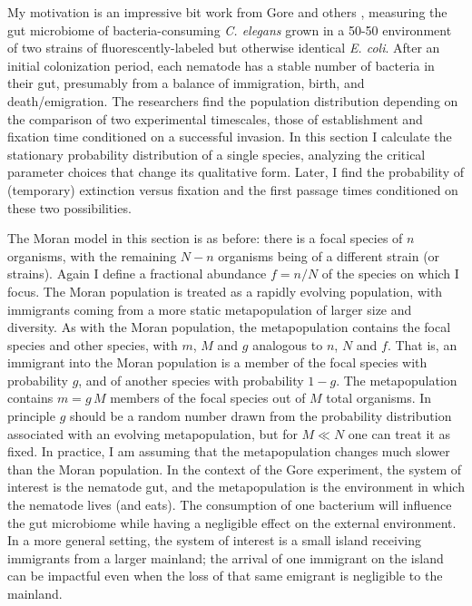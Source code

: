 My motivation is an impressive bit work from Gore and others \cite{Vega2017}, measuring the gut microbiome of bacteria-consuming \emph{C. elegans} grown in a 50-50 environment of two strains of fluorescently-labeled but otherwise identical \emph{E. coli}. 
After an initial colonization period, each nematode has a stable number of bacteria in their gut, presumably from a balance of immigration, birth, and death/emigration. 
The researchers find the population distribution depending on the comparison of two experimental timescales, those of establishment and fixation time conditioned on a successful invasion. 
In this section I calculate the stationary probability distribution of a single species, analyzing the critical parameter choices that change its qualitative form. 
Later, I find the probability of (temporary) extinction versus fixation and the first passage times conditioned on these two possibilities. 

The Moran model in this section is as before: there is a focal species of $n$ organisms, with the remaining $N-n$ organisms being of a different strain (or strains). 
Again I define a fractional abundance $f=n/N$ of the species on which I focus. 
The Moran population is treated as a rapidly evolving population, with immigrants coming from a more static metapopulation of larger size and diversity. 
As with the Moran population, the metapopulation contains the focal species and other species, with $m$, $M$ and $g$ analogous to $n$, $N$ and $f$. 
That is, an immigrant into the Moran population is a member of the focal species with probability $g$, and of another species with probability $1-g$. 
The metapopulation contains $m = g\,M$ members of the focal species out of $M$ total organisms. 
In principle $g$ should be a random number drawn from the probability distribution associated with an evolving metapopulation, but for $M\ll N$ one can treat it as fixed. 
In practice, I am assuming that the metapopulation changes much slower than the Moran population. %
In the context of the Gore experiment, the system of interest is the nematode gut, and the metapopulation is the environment in which the nematode lives (and eats). 
The consumption of one bacterium will influence the gut microbiome while having a negligible effect on the external environment. 
In a more general setting, the system of interest is a small island receiving immigrants from a larger mainland; the arrival of one immigrant on the island can be impactful even when the loss of that same emigrant is negligible to the mainland. 

